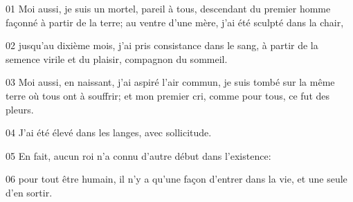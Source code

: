 01 Moi aussi, je suis un mortel, pareil à tous, descendant du premier homme façonné à partir de la terre; au ventre d’une mère, j’ai été sculpté dans la chair,

02 jusqu’au dixième mois, j’ai pris consistance dans le sang, à partir de la semence virile et du plaisir, compagnon du sommeil.

03 Moi aussi, en naissant, j’ai aspiré l’air commun, je suis tombé sur la même terre où tous ont à souffrir; et mon premier cri, comme pour tous, ce fut des pleurs.

04 J’ai été élevé dans les langes, avec sollicitude.

05 En fait, aucun roi n’a connu d’autre début dans l’existence:

06 pour tout être humain, il n’y a qu’une façon d’entrer dans la vie, et une seule d’en sortir.
